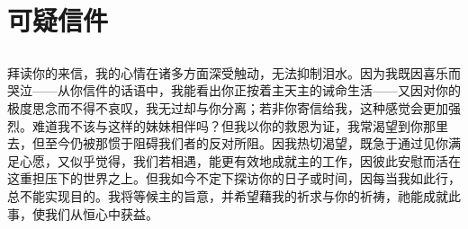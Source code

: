 
\chapter{可疑信件}



\section{}


\section{}

\par


\subsection{}

拜读你的来信，我的心情在诸多方面深受触动，无法抑制泪水。因为我既因喜乐而哭泣——从你信件的话语中，我能看出你正按着主天主的诫命生活——又因对你的极度思念而不得不哀叹，我无过却与你分离；若非你寄信给我，这种感觉会更加强烈。难道我不该与这样的妹妹相伴吗？但我以你的救恩为证，我常渴望到你那里去，但至今仍被那惯于阻碍我们者的反对所阻。因我热切渴望，既急于通过见你满足心愿，又似乎觉得，我们若相遇，能更有效地成就主的工作，因彼此安慰而活在这重担压下的世界之上。但我如今不定下探访你的日子或时间，因每当我如此行，总不能实现目的。我将等候主的旨意，并希望藉我的祈求与你的祈祷，祂能成就此事，使我们从恒心中获益。\par


\subsection{}

